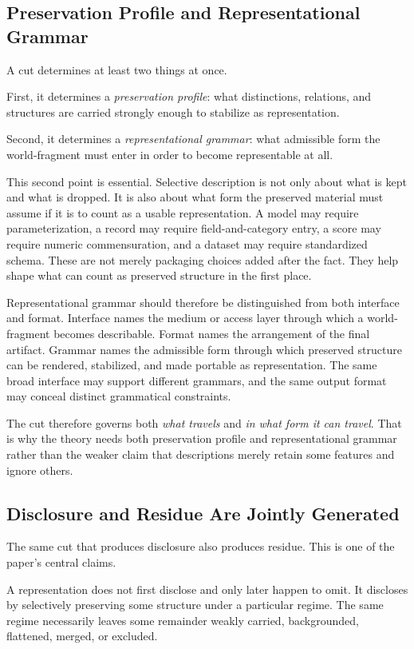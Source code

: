 \documentclass[11pt]{article}
\renewcommand{\emph}[1]{\textit{#1}}
\begin{document}
\subsection{Preservation Profile and Representational Grammar}

A cut determines at least two things at once.

First, it determines a \emph{preservation profile}: what distinctions, relations, and structures are carried strongly enough to stabilize as representation.

Second, it determines a \emph{representational grammar}: what admissible form the world-fragment must enter in order to become representable at all.

This second point is essential. Selective description is not only about what is kept and what is dropped. It is also about what form the preserved material must assume if it is to count as a usable representation. A model may require parameterization, a record may require field-and-category entry, a score may require numeric commensuration, and a dataset may require standardized schema. These are not merely packaging choices added after the fact. They help shape what can count as preserved structure in the first place.

Representational grammar should therefore be distinguished from both interface and format. Interface names the medium or access layer through which a world-fragment becomes describable. Format names the arrangement of the final artifact. Grammar names the admissible form through which preserved structure can be rendered, stabilized, and made portable as representation. The same broad interface may support different grammars, and the same output format may conceal distinct grammatical constraints.

The cut therefore governs both \emph{what travels} and \emph{in what form it can travel}. That is why the theory needs both preservation profile and representational grammar rather than the weaker claim that descriptions merely retain some features and ignore others.

\subsection{Disclosure and Residue Are Jointly Generated}

The same cut that produces disclosure also produces residue. This is one of the paper's central claims.

A representation does not first disclose and only later happen to omit. It discloses by selectively preserving some structure under a particular regime. The same regime necessarily leaves some remainder weakly carried, backgrounded, flattened, merged, or excluded.
\end{document}
